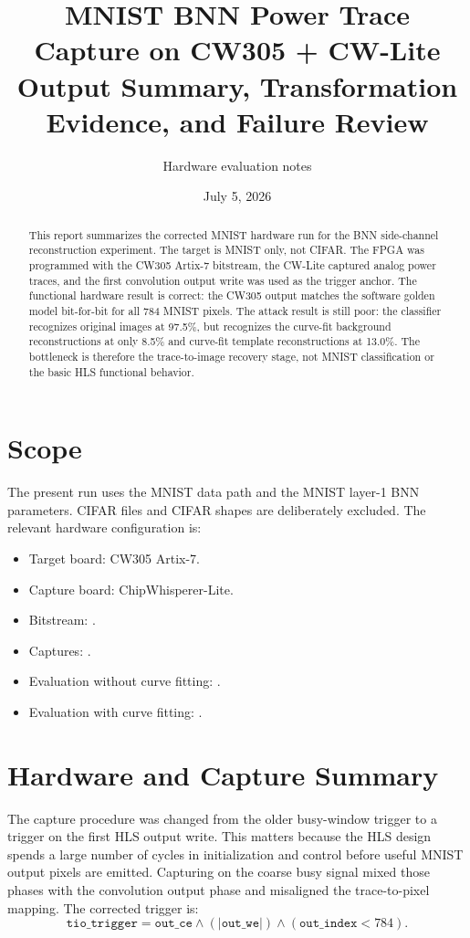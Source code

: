 \documentclass[11pt]{article}
\title{MNIST BNN Power Trace Capture on CW305 + CW-Lite\\
\large Output Summary, Transformation Evidence, and Failure Review}
\author{Hardware evaluation notes}
\date{July 5, 2026}
\begin{document}
\maketitle

\begin{abstract}
This report summarizes the corrected MNIST hardware run for the BNN side-channel
reconstruction experiment.  The target is MNIST only, not CIFAR.  The FPGA was
programmed with the CW305 Artix-7 bitstream, the CW-Lite captured analog power
traces, and the first convolution output write was used as the trigger anchor.
The functional hardware result is correct: the CW305 output matches the software
golden model bit-for-bit for all 784 MNIST pixels.  The attack result is still
poor: the classifier recognizes original images at 97.5\%, but recognizes the
curve-fit background reconstructions at only 8.5\% and curve-fit template
reconstructions at 13.0\%.  The bottleneck is therefore the trace-to-image
recovery stage, not MNIST classification or the basic HLS functional behavior.
\end{abstract}

\section{Scope}
The present run uses the MNIST data path and the MNIST layer-1 BNN parameters.
CIFAR files and CIFAR shapes are deliberately excluded.  The relevant hardware
configuration is:

\begin{itemize}
  \item Target board: CW305 Artix-7.
  \item Capture board: ChipWhisperer-Lite.
  \item Bitstream: .
  \item Captures: .
  \item Evaluation without curve fitting: .
  \item Evaluation with curve fitting: .
\end{itemize}

\section{Hardware and Capture Summary}
The capture procedure was changed from the older busy-window trigger to a trigger
on the first HLS output write.  This matters because the HLS design spends a
large number of cycles in initialization and control before useful MNIST output
pixels are emitted.  Capturing on the coarse busy signal mixed those phases with
the convolution output phase and misaligned the trace-to-pixel mapping.  The
corrected trigger is:
\[
\texttt{tio\_trigger} = \texttt{out\_ce} \land (|\texttt{out\_we}|) \land
(\texttt{out\_index} < 784).
\]
\end{document}
